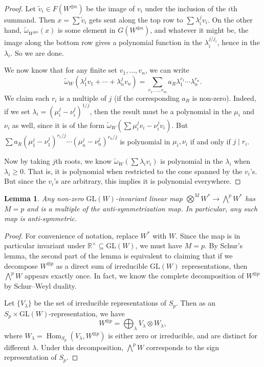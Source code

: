\documentclass{shortart}
\newtheorem{lemma}[thm]{Lemma}
\theoremstyle{definition}
\DeclareMathOperator\Hom{Hom}
\newcommand\GL{\mathrm{GL}}
\newcommand\R{\mathbb{R}}
\newcommand\exterior{{\textstyle \bigwedge}}
\begin{document}
\begin{proof}
  Let $\tilde{v}_i \in F(W^{\oplus n})$ be the image of $v_i$ under the inclusion of the $i$th summand. Then $x = \sum \tilde{v}_i$ gets sent along the top row to $\sum \lambda_i^j v_i$. On the other hand, $\tilde{\omega}_{W^{\oplus n}}(x)$ is some element in $G(W^{\oplus n})$, and whatever it might be, the image along the bottom row gives a polynomial function in the $\lambda_i^{j/j_i}$, hence in the $\lambda_i$. So we are done.

  We now know that for any finite set $v_1, \ldots, v_n$, we can write
  \[
    \tilde{\omega}_W(\lambda_1^j v_1 + \cdots + \lambda_n^j v_n) = \sum_{r_1, \ldots, r_m} a_R \lambda_1^{r_1} \cdots \lambda_n^{r_n}.
  \]
  We claim each $r_i$ is a multiple of $j$ (if the corresponding $a_R$ is non-zero). Indeed, if we set $\lambda_i = (\mu_i^j - \nu_i^j)^{1/j}$, then the result must be a polynomial in the $\mu_i$ and $\nu_i$ as well, since it is of the form $\tilde{\omega}_W(\sum \mu_i^j v_i - \nu_i^j v_i)$. But $\sum a_R (\mu_1^j - \nu_1^j)^{r_1/ j} \cdots (\mu_n^j - \nu_n^j)^{r_n/ j}$ is polynomial in $\mu_i, \nu_i$ if and only if $j \mid r_i$.

  Now by taking $j$th roots, we know $\tilde{\omega}_W(\sum \lambda_i v_i)$ is polynomial in the $\lambda_i$ when $\lambda_i \geq 0$. That is, it is polynomial when restricted to the cone spanned by the $v_i$'s. But since the $v_i$'s are arbitrary, this implies it is polynomial everywhere.
\end{proof}

\begin{lemma}
  Any non-zero $\GL(W)$-invariant linear map $\bigotimes^M W^* \to \exterior^p W^*$ has $M = p$ and is a multiple of the anti-symmetrization map. In particular, any such map is anti-symmetric.
\end{lemma}

\begin{proof}
  For convenience of notation, replace $W^*$ with $W$. Since the map is in particular invariant under $\R^\times \subseteq \GL(W)$, we must have $M = p$. By Schur's lemma, the second part of the lemma is equivalent to claiming that if we decompose $W^{\otimes p}$ as a direct sum of irreducible $\GL(W)$ representations, then $\exterior^p W$ appears exactly once. In fact, we know the complete decomposition of $W^{\otimes p}$ by Schur--Weyl duality.

  Let $\{V_\lambda\}$ be the set of irreducible representations of $S_p$. Then as an $S_p \times \GL(W)$-representation, we have
  \[
    W^{\otimes p} = \bigoplus_\lambda V_\lambda \otimes W_\lambda,
  \]
  where $W_\lambda = \Hom_{S_p} (V_\lambda, W^{\otimes p})$ is either zero or irreducible, and are distinct for different $\lambda$. Under this decomposition, $\exterior^p W$ corresponds to the sign representation of $S_p$.
\end{proof}
\end{document}
